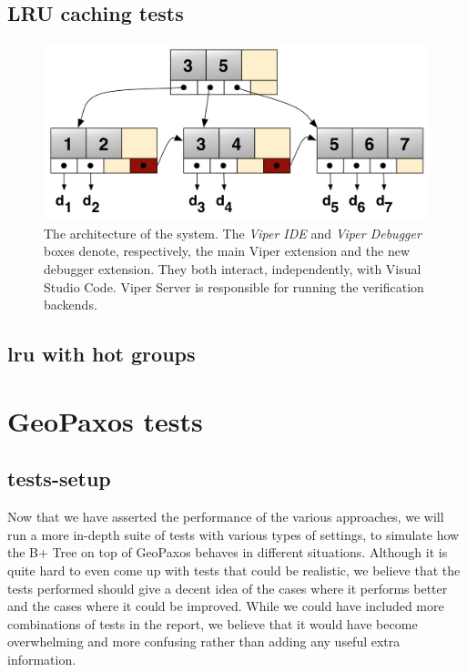 \subsection{LRU caching tests}\label{sec:lru-caching-tests}
\begin{figure}[htb]
  \centering
  \includegraphics[width=\textwidth,height=\textheight,keepaspectratio]{img/b+tree.png}
  \caption[The architecture of the system]{ The architecture of the system. The
    \textit{Viper IDE} and \textit{Viper Debugger} boxes denote, respectively,
    the main Viper extension and the new debugger extension. They both interact,
    independently, with Visual Studio Code. Viper Server is responsible for
    running the verification backends.}
  \label{fig:b+tree}
\end{figure}

\subsection{lru with hot groups}\label{sec:lru-hot-groups}

\section{GeoPaxos tests}\label{sec:geopaxos-tests}

\subsection{tests-setup}\label{sec:tests-setup}
Now that we have asserted the performance of the various approaches, we will run a more in-depth suite of tests with various types of settings, to simulate how the B+ Tree on top of GeoPaxos behaves in different situations. Although it is quite hard to even come up with tests that could be realistic, we believe that the tests performed should give a decent idea of the cases where it performs better and the cases where it could be improved. While we could have included more combinations of tests in the report, we believe that it would have become overwhelming and more confusing rather than adding any useful extra information.

